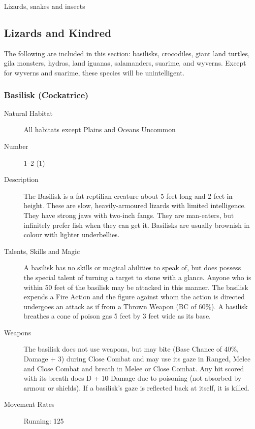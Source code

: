 \begin{mmgroup}{Lizards, snakes and insects}

\subsection{Lizards and Kindred}
The following are included in this section: basilisks, crocodiles,
giant land turtles, gila monsters, hydras, land iguanas, salamanders,
suarime, and wyverns.  Except for wyverns and suarime, these species
will be unintelligent.

\subsubsection{Basilisk (Cockatrice)}

\begin{description}
\item[Natural Habitat] All habitats except Plains and Oceans Uncommon

\item[Number] 1–2 (1)

\item[Description] The Basilisk is a fat reptilian creature about 5 feet
long and 2 feet in height. These are slow, heavily-armoured lizards
with limited intelligence.  They have strong jaws with two-inch
fangs.  They are man-eaters, but infinitely prefer fish when they can
get it.  Basilisks are usually brownish in colour with lighter
underbellies.

\item[Talents, Skills and Magic] A basilisk has no skills or magical abilities to speak of,
but does possess the special talent of turning a target to stone with
a glance.  Anyone who is within 50 feet of the basilisk may be
attacked in this manner.  The basilisk expends a Fire Action and the
figure against whom the action is directed undergoes an attack as if
from a Thrown Weapon (BC of 60\%). A basilisk breathes a cone of
poison gas 5 feet by 3 feet wide as its base.

\item[Weapons] The basilisk does not use weapons, but may bite (Base Chance
of 40\%, Damage + 3) during Close Combat and may use its gaze in
Ranged, Melee and Close Combat and breath in Melee or Close Combat.
Any hit scored with its breath does D + 10 Damage due to poisoning
(not absorbed by armour or shields). If a basilisk's gaze is reflected
back at itself, it is killed.

\item[Movement Rates] Running: 125


\end{description}
\end{mmgroup}

